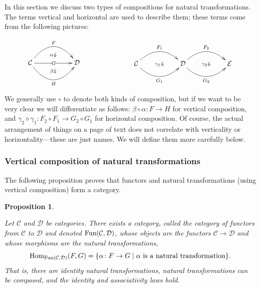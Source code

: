 \documentclass{book}
\def\tn{\textnormal}
\def\mc{\mathcal}
\def\Hom{\tn{Hom}}
\def\Fun{\tn{Fun}}
\def\to{\rightarrow}
\def\Down{\Downarrow}
\def\taking{\colon}
\def\too{\longrightarrow}
\def\|{{\;|\;}}
\def\mcC{\mc{C}}
\def\mcD{\mc{D}}
\def\mcE{\mc{E}}
\newtheorem{proposition}[subsubsection]{Proposition}
\theoremstyle{remark}
\theoremstyle{definition}
\begin{document}
In this section we discuss two types of compositions for natural transformations. The terms vertical and horizontal are used to describe them; these terms come from the following pictures:

$$
\parbox{1in}{\xymatrix{&\ar@{}[d]|(.65){\alpha\Down}\\\mcC\ar@/^2pc/[rr]^F\ar[rr]|G\ar@/_2pc/[rr]_H&&\mcD\\&\ar@{}[u]|(.65){\beta\Down}}}
\hspace{1in}
\parbox{2in}{\xymatrix{\mcC\ar@/^1.5pc/[rr]^{F_1}\ar@{}[rr]|{\gamma_1\Down}\ar@/_1.5pc/[rr]_{G_1}&&\mcD\ar@/^1.5pc/[rr]^{F_2}\ar@{}[rr]|{\gamma_2\Down}\ar@/_1.5pc/[rr]_{G_2}&&\mcE}}
$$
We generally use $\circ$ to denote both kinds of composition, but if we want to be very clear we will differentiate as follows: $\beta\circ\alpha\taking F\to H$ for vertical composition, and $\gamma_2\diamond\gamma_1\taking F_2\circ F_1\too G_2\circ G_1$ for horizontal composition. Of course, the actual arrangement of things on a page of text does not correlate with verticality or horizontality---these are just names. We will define them more carefully below.


\subsubsection{Vertical composition of natural transformations}

The following proposition proves that functors and natural transformations (using vertical composition) form a category.

\begin{proposition}\label{prop:Fun(C,D)}

Let $\mcC$ and $\mcD$ be categories. There exists a category, called {\em the category of functors from $\mcC$ to $\mcD$} and denoted $\Fun(\mcC,\mcD)$\index{a symbol!$\Fun$}, whose objects are the functors $\mcC\to\mcD$ and whose morphisms are the natural transformations,
$$\Hom_{\Fun(\mcC,\mcD)}(F,G)=\{\alpha\taking F\to G\|\alpha\tn{ is a natural transformation}\}.$$That is, there are identity natural transformations, natural transformations can be composed, and the identity and associativity laws hold.

\end{proposition}
\end{document}
